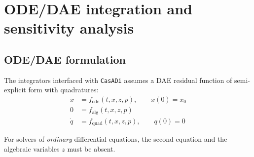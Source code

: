 \documentclass[a4paper,12pt]{book}
\newcommand{\CasADi}{\texttt{CasADi}\xspace}
\begin{document}

\chapter{ODE/DAE integration and sensitivity analysis} \label{ch:integrators}
\section{ODE/DAE formulation}
The integrators interfaced with \CasADi assumes a DAE residual function of semi-explicit form with quadratures:
\begin{subequations}
\begin{align}
 \dot{x} &= f_{\text{ode}}(t,x,z,p), \qquad x(0) = x_0 \\
      0  &= f_{\text{alg}}(t,x,z,p) \\
 \dot{q} &= f_{\text{quad}}(t,x,z,p), \qquad q(0) = 0
\end{align}
\end{subequations}

For solvers of \emph{ordinary} differential equations, the second equation and the algebraic variables $z$ must be absent.

\end{document}
